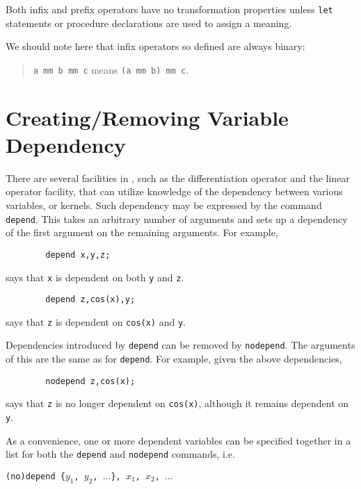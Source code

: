 Both infix and prefix operators have no transformation
properties unless \texttt{let} statements or procedure
declarations are used to assign a meaning.

We should note here that infix operators so defined are always binary:
\begin{quote}
\hspace{0.2in}\texttt{a mm b mm c}\hspace{.3in} means \hspace{.3in}
\texttt{(a mm b) mm c}.
\end{quote}

\section{Creating/Removing Variable Dependency}
\hypertarget{command:DEPEND}{}
\hypertarget{command:NODEPEND}{}

There are several facilities in {\REDUCE}, such as the differentiation
operator and the linear operator facility, that
can utilize knowledge of the dependency between various variables, or
kernels.  Such dependency may be expressed by the command
\texttt{depend}.
This takes an arbitrary number of arguments and
sets up a dependency of the first argument on the remaining arguments.
For example,
\begin{verbatim}
        depend x,y,z;
\end{verbatim}
says that \texttt{x} is dependent on both \texttt{y} and \texttt{z}.
\begin{verbatim}
        depend z,cos(x),y;
\end{verbatim}
says that \texttt{z} is dependent on \texttt{cos(x)} and \texttt{y}.

Dependencies introduced by \texttt{depend} can be removed by \texttt{nodepend}.
 The arguments of this are the same as for \texttt{depend}.
For example, given the above dependencies,
\begin{verbatim}
        nodepend z,cos(x);
\end{verbatim}
says that \texttt{z} is no longer dependent on \texttt{cos(x)}, although it remains
dependent on \texttt{y}.

As a convenience, one or more dependent variables can be specified
together in a list for both the \texttt{depend} and \texttt{nodepend}
commands, i.e.

\texttt{(no)depend \{$y_1$, $y_2$, $\ldots$\}, $x_1$, $x_2$, $\ldots$}

